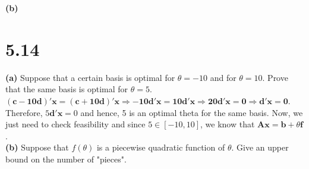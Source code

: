 \documentclass{article}
\begin{document}
\textbf{(b)}

\section*{5.14}
\textbf{(a)} Suppose that a certain basis is optimal for $\theta = -10$ and for $\theta = 10$.  Prove that the same basis is optimal for $\theta = 5$.  \\

\noindent
$\mathbf{(c - 10d)' x = (c + 10d)' x \Rightarrow -10d'x = 10d'x \Rightarrow 20d'x = 0 \Rightarrow d'x = 0}$.  Therefore, $5 \mathbf{d'x} = 0$ and hence, 5 is an optimal theta for the same basis.  Now, we just need to check feasibility and since $5 \in [-10, 10]$, we know that $\mathbf{Ax = b} + \theta \mathbf{f}$. \\

\textbf{(b)}  Suppose that $f(\theta)$ is a piecewise quadratic function of $\theta$.  Give an upper bound on the number of "pieces". \\

\noindent
\end{document}
